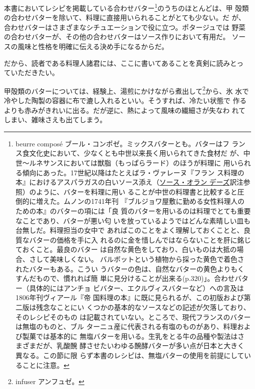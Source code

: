 本書においてレシピを掲載している合わせバター\footnote{beurre composé
  ブール・コンポゼ。ミックスバターとも。バターはフ
  ランス食文化史において、少なくとも中世以来長く用いられてきた食材だ
  が、中世〜ルネサンスにおいては獣脂（もっぱらラード）のほうが料理に
  用いられる傾向にあった。17世紀以降はたとえばラ・ヴァレーヌ『フラン
  ス料理の本』におけるアスパラガスの白いソース添え（\protect\hyperlink{sauce-hollandaise}{ソース・オラン
  デーズ}訳注参照）のように、バターを料理に用い
  ることが中世の料理書と比較すると圧倒的に増えた。ムノンの1741年刊
  『ブルジョワ屋敷に勤める女性料理人のための本』のバターの項には「良
  質のバターを用いるのは料理でとても重要なことであり、バターが悪い匂
  いを放っているようではどんな素晴しい皿も台無しだ。料理担当の女中で
  あればこのことをよく理解しておくことと、良質なバターの価格を手に入
  れるのに金を惜しんではならないことを肝に銘じておくこと。最良のバター
  は自然な黄色をしており、白いものは大抵の場合、さして美味しくない。
  バルボットという植物から採った黄色で着色されたバターもある。こうい
  うバターの色は、自然なバターの黄色よりもくすんだもので、慣れれば簡
  単に見分けることが出来る(p.320)」。合わせバター（具体的にはアンチョ
  ビバター、エクルヴィスバターなど）への言及は1806年刊ヴィアール『帝
  国料理の本』に既に見られるが、この初版および第二版は残念なことにい
  くつかの基本的なソースなどの記述が欠落しており、そのレシピそのもの
  は記載されていない。ところで、現代フランスのバターは無塩のものと、ブル
  ターニュ産に代表される有塩のものがあり、料理および製菓では基本的に
  無塩バターを用いる。生乳をとる牛の品種や製法はさまざまだが、乳酸醗
  酵させたいわゆる醗酵バターが多い点が日本と大きく異なる。この節に限
  らず本書のレシピは、無塩バターの使用を前提にしていることに注意。}のうちのほとんどは、甲
殻類の合わせバターを除いて、料理に直接用いられることがとても少ない。だ
が、合わせバターはさまざまなシチュエーションで役に立つ。ポタージュでは
野菜の合わせバターが、その他の合わせバターはソース作りにおいて有用だ。
ソースの風味と性格を明確に伝える決め手になるからだ。

だから、読者である料理人諸君には、ここに書いてあることを真剣に読みとっ
ていただきたい。\href{原文における内容矛盾。この後のパラグラフは甲殻類の\%20バターについての注意点ばかりが目立つ}{}

甲殻類のバターについては、経験上、湯煎にかけながら煮出して\footnote{infuser
  アンフュゼ。}から、氷
水で冷やした陶製の容器に布で漉し入れるといい。そうすれば、冷たい状態で
作るよりも赤みがきれいに出る。だが逆に、熱によって風味の繊細さが失なわ
れてしまい、雑味さえも出てしまう。

